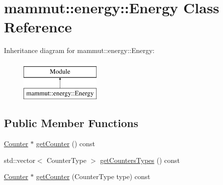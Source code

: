 \hypertarget{classmammut_1_1energy_1_1Energy}{\section{mammut\-:\-:energy\-:\-:Energy Class Reference}
\label{classmammut_1_1energy_1_1Energy}
}
Inheritance diagram for mammut\-:\-:energy\-:\-:Energy\-:\begin{figure}[H]
\begin{center}
\leavevmode
\includegraphics[height=2.000000cm]{classmammut_1_1energy_1_1Energy}
\end{center}
\end{figure}
\subsection*{Public Member Functions}
\begin{DoxyCompactItemize}
\item 
\hyperlink{classmammut_1_1energy_1_1Counter}{Counter} $\ast$ \hyperlink{classmammut_1_1energy_1_1Energy_a524158ed347170c087670e1ed42bdf8f}{get\-Counter} () const 
\item 
std\-::vector$<$ Counter\-Type $>$ \hyperlink{classmammut_1_1energy_1_1Energy_a76e8ff294bd6e9104aedcfe4beceaba5}{get\-Counters\-Types} () const 
\item 
\hyperlink{classmammut_1_1energy_1_1Counter}{Counter} $\ast$ \hyperlink{classmammut_1_1energy_1_1Energy_aa3f0d7dbe5bab0693805034e9212aa51}{get\-Counter} (Counter\-Type type) const 
\end{DoxyCompactItemize}


